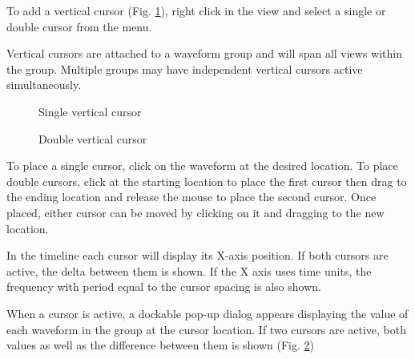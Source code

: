 To add a vertical cursor (Fig. \ref{vertical-cursor}), right click in the view and select a single or double cursor
from the  menu.

Vertical cursors are attached to a waveform group and will span all views within the group. Multiple groups may have
independent vertical cursors active simultaneously.

\begin{figure}[H]
\centering
{}
\caption{Single vertical cursor}
\label{vertical-cursor}
\end{figure}

\begin{figure}[H]
\centering
{}
\caption{Double vertical cursor}
\label{vertical-cursor-x2}
\end{figure}

To place a single cursor, click on the waveform at the desired location. To place double cursors, click at the starting
location to place the first cursor then drag to the ending location and release the mouse to place the second cursor.
Once placed, either cursor can be moved by clicking on it and dragging to the new location.


In the timeline each cursor will display its X-axis position. If both cursors are active, the delta between them
is shown. If the X axis uses time units, the frequency with period equal to the cursor spacing is also shown.

When a cursor is active, a dockable pop-up dialog appears displaying the value of each waveform in the group at the
cursor location. If two cursors are active, both values as well as the difference between them is shown (Fig.
\ref{vertical-cursor-x2})


\begin{comment}

If a protocol analyzer view (Chap. \ref{chapter:protoanalyzer}) is active, moving a single cursor over a packet will
scroll to and highlight that packet.

\end{comment}

